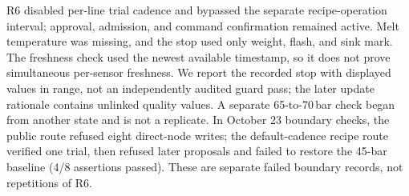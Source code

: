 R6 disabled per-line trial cadence and bypassed the separate recipe-operation
interval; approval, admission, and command confirmation remained active.
Melt temperature was missing, and the stop used only weight, flash, and sink
mark. The freshness check used the newest available timestamp, so it does not
prove simultaneous per-sensor freshness. We report the recorded stop with
displayed values in range, not an independently audited guard pass; the later
update rationale contains unlinked quality values. A separate 65-to-70\,bar
check began from another state and is not a replicate. In October 23 boundary
checks, the public route refused eight direct-node writes; the default-cadence
recipe route verified one trial, then refused later proposals and failed to
restore the 45-bar baseline (4/8 assertions passed). These are separate
failed boundary records, not repetitions of R6.
